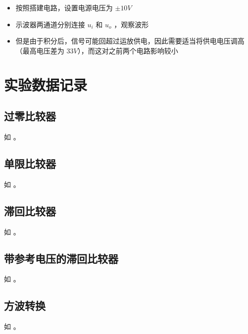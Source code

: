 \documentclass[lang=cn,11pt,a4paper,cite=authoryear]{elegantpaper}
\begin{document}
\begin{itemize}
    \item 按照搭建电路，设置电源电压为 \(\pm 10 V\)
    \item 示波器两通道分别连接 \(u_i\) 和 \(u_o\) ，观察波形
    \item 但是由于积分后，信号可能回超过运放供电，因此需要适当将供电电压调高（最高电压差为 \(33V\)），而这对之前两个电路影响较小
\end{itemize}



\section{实验数据记录}

\subsection{过零比较器}

如  。


\subsection{单限比较器}

如  。


\subsection{滞回比较器}

如  。


\subsection{带参考电压的滞回比较器}


如  。


\subsection{方波转换}

如  。
\end{document}
